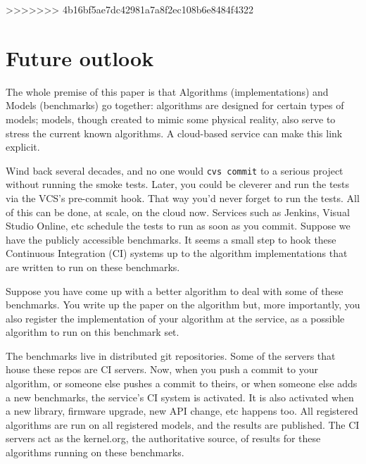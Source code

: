 \documentclass[conference]{IEEEtran}
\begin{document}
>>>>>>> 4b16bf5ae7dc42981a7a8f2ec108b6e8484f4322




\section{Future outlook}





The whole premise of this paper is that Algorithms (implementations)
and Models (benchmarks) go together: algorithms are designed for
certain types of models; models, though created to mimic some physical
reality, also serve to stress the current known algorithms. A
cloud-based service can make this link explicit.

Wind back several decades, and no one would {\texttt{cvs commit}} to a
serious project without running the smoke tests. Later, you could be
cleverer and run the tests via the VCS's pre-commit hook. That way
you'd never forget to run the tests. All of this can be done, at
scale, on the cloud now. Services such as Jenkins, Visual Studio
Online, etc schedule the tests to run as soon as you commit. Suppose
we have the publicly accessible benchmarks. It seems a small step to
hook these Continuous Integration (CI) systems up to the algorithm
implementations that are written to run on these benchmarks.

Suppose you have come up with a better algorithm to deal with some of
these benchmarks. You write up the paper on the algorithm but, more
importantly, you also register the implementation of your algorithm at
the service, as a possible algorithm to run on this benchmark set.

The benchmarks live in distributed git repositories. Some of the
servers that house these repos are CI servers. Now, when you push a
commit to your algorithm, or someone else pushes a commit to theirs,
or when someone else adds a new benchmarks, the service's CI system is
activated. It is also activated when a new library, firmware upgrade,
new API change, etc happens too. All registered algorithms are run on
all registered models, and the results are published. The CI servers
act as the kernel.org, the authoritative source, of results for these
algorithms running on these benchmarks.
\end{document}
